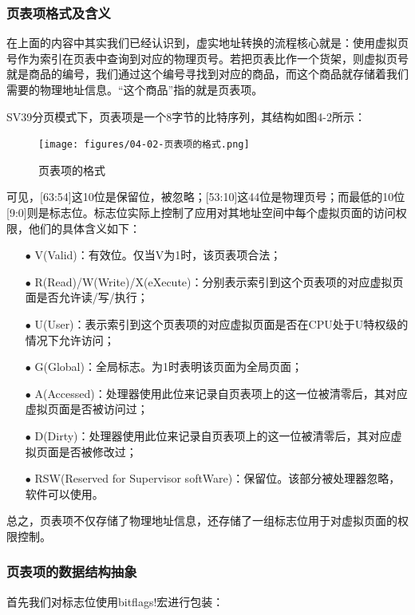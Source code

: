 \subsubsection{页表项格式及含义}

在上面的内容中其实我们已经认识到，虚实地址转换的流程核心就是：使用虚拟页号作为索引在页表中查询到对应的物理页号。若把页表比作一个货架，则虚拟页号就是商品的编号，我们通过这个编号寻找到对应的商品，而这个商品就存储着我们需要的物理地址信息。“这个商品”指的就是页表项。

SV39分页模式下，页表项是一个8字节的比特序列，其结构如图4-2所示：

\begin{figure}[h]
	\centering
	\texttt{[image: figures/04-02-页表项的格式.png]}
	\caption{页表项的格式}
\end{figure}\FloatBarrier

可见，[63:54]这10位是保留位，被忽略；[53:10]这44位是物理页号；而最低的10位[9:0]则是标志位。标志位实际上控制了应用对其地址空间中每个虚拟页面的访问权限，他们的具体含义如下：

\begin{itemize}
	\item [$\bullet$]
	V(Valid)：有效位。仅当V为1时，该页表项合法；
	\item [$\bullet$]
	R(Read)/W(Write)/X(eXecute)：分别表示索引到这个页表项的对应虚拟页面是否允许读/写/执行；
	\item [$\bullet$]
	U(User)：表示索引到这个页表项的对应虚拟页面是否在CPU处于U特权级的情况下允许访问；
	\item [$\bullet$]
	G(Global)：全局标志。为1时表明该页面为全局页面；
	\item [$\bullet$]
	A(Accessed)：处理器使用此位来记录自页表项上的这一位被清零后，其对应虚拟页面是否被访问过；
	\item [$\bullet$]
	D(Dirty)：处理器使用此位来记录自页表项上的这一位被清零后，其对应虚拟页面是否被修改过；
	\item [$\bullet$]
	RSW(Reserved for Supervisor softWare)：保留位。该部分被处理器忽略，软件可以使用。	
\end{itemize}

总之，页表项不仅存储了物理地址信息，还存储了一组标志位用于对虚拟页面的权限控制。

\subsubsection{页表项的数据结构抽象}

首先我们对标志位使用bitflags!宏进行包装：

